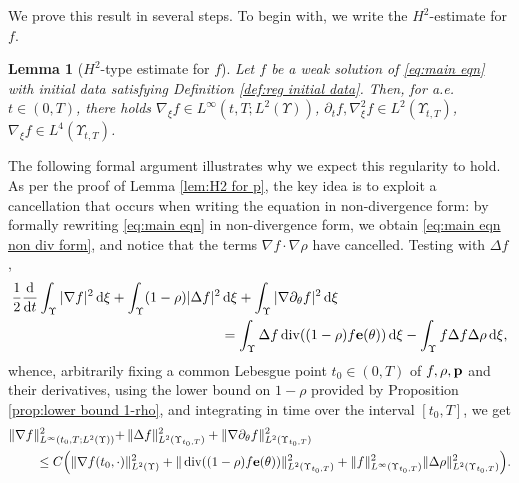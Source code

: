 \documentclass[11pt,a4paper,reqno]{amsart}
\newtheorem{lemma}[prop]{Lemma}
\theoremstyle{remark}
\theoremstyle{definition}
\numberwithin{equation}{section}
\DeclareMathOperator{\dv}{div}
\newcommand{\p}{{\bf p}}
\newcommand{\e}{{\bf e}}
\newcommand{\bxi}{\xi}
\renewcommand{\d}{\, \mathrm{d} }
\newcommand{\der}{\mathrm{d}}
\begin{document}
We prove this result in several steps. To begin with, we write the $H^2$-estimate for $f$. 

\begin{lemma}[$H^2$-type estimate for $f$]\label{lem:H2 for f}
Let $f$ be a weak solution of \eqref{eq:main eqn} with initial data satisfying Definition \ref{def:reg initial data}. Then, for a.e.~$t \in (0,T)$, there holds $\nabla_{\bxi}f \in L^\infty(t,T;L^2(\Upsilon))$, $\partial_t f, \nabla^2_{\bxi} f \in L^2(\Upsilon_{t,T})$, $\nabla_{\bxi}f \in L^4(\Upsilon_{t,T})$. 
\end{lemma}

The following formal argument illustrates why we expect this regularity to hold. As per the proof of Lemma \ref{lem:H2 for p}, the key idea is to exploit a cancellation that occurs when writing the equation in non-divergence form: by formally rewriting \eqref{eq:main eqn} in non-divergence form, we obtain \eqref{eq:main eqn non div form}, and notice that the terms $\nabla f \!\cdot\!\nabla \rho$ have cancelled. Testing with $\Delta f$, 
    \begin{equation*}
        \begin{aligned}
            \frac{1}{2}\frac{\der}{\der t}\int_\Upsilon |\nabla f|^2 \d \bxi + \int_\Upsilon (1-\rho)|\Delta f|^2 & \d \bxi + \int_\Upsilon |\nabla \partial_\theta f|^2 \d \bxi \\ 
            &= \int_\Upsilon \Delta f \dv((1-\rho)f \e(\theta)) \d \bxi -\int_\Upsilon f \Delta f \Delta \rho \d \bxi, 
        \end{aligned}
    \end{equation*}
    whence, arbitrarily fixing a common Lebesgue point $t_0 \in (0,T)$ of $f,\rho,\p$ and their derivatives, using the lower bound on $1-\rho$ provided by Proposition \ref{prop:lower bound 1-rho}, and integrating in time over the interval $[t_0,T]$, we get 
         \begin{equation*}
        \begin{aligned}
           \Vert \nabla f\Vert_{L^\infty(t_0,T;L^2(\Upsilon))}^2 +& \, \Vert  \Delta f\Vert_{L^2(\Upsilon_{t_0,T})}^2 + \Vert \nabla \partial_\theta f \Vert_{L^2(\Upsilon_{t_0,T})}^2 \\ 
            \leq C \Big( \Vert \nabla f (t_0,\cdot) &\Vert^2_{L^2(\Upsilon)} + \Vert \dv((1-\rho)f \e(\theta)) \Vert_{L^2(\Upsilon_{t_0,T})}^2 + \Vert f \Vert^2_{L^\infty(\Upsilon_{t_0,T})}\Vert \Delta \rho \Vert^2_{L^2(\Upsilon_{t_0,T})} \Big). 
        \end{aligned}
    \end{equation*}
\end{document}
